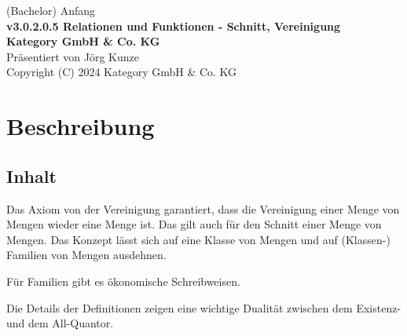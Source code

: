 \documentclass[a4paper]{amsart}
\theoremstyle{definition}
\begin{document}
\begin{titlepage}
\centering
{\huge
(Bachelor) Anfang\\[1cm]
\textbf{v3.0.2.0.5 Relationen und Funktionen - Schnitt, Vereinigung}
}\\[1cm]

\textbf{Kategory GmbH \& Co. KG}\\
Präsentiert von Jörg Kunze\\
Copyright (C) 2024 Kategory GmbH \& Co. KG

\end{titlepage}

%

\newpage

\section*{Beschreibung}

\subsection*{Inhalt}
Das Axiom von der Vereinigung garantiert, dass die Vereinigung einer Menge von Mengen wieder eine Menge ist. Das gilt auch für den Schnitt einer Menge von Mengen. Das Konzept lässt sich auf eine Klasse von Mengen und auf (Klassen-) Familien von Mengen ausdehnen.

Für Familien gibt es ökonomische Schreibweisen.

Die Details der Definitionen zeigen eine wichtige Dualität zwischen dem Existenz- und dem All-Quantor. 
\end{document}
